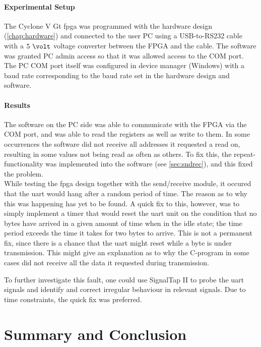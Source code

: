 \documentclass[main.tex]{subfiles}
\begin{document}
\subsubsection{Experimental Setup}

The Cyclone V Gt \gls{fpga} was programmed with the hardware design (\ref{chap:hardware}) and connected to the user PC using a USB-to-RS232 cable with a $5~\volt$ voltage converter between the FPGA and the cable. The software was granted PC admin access so that it was allowed access to the COM port. The PC COM port itself was configured in device manager (Windows) with a baud rate corresponding to the baud rate set in the hardware design and software. 

\subsubsection{Results}

The software on the PC side was able to communicate with the FPGA via the COM port, and was able to read the registers as well as write to them. In some occurrences the software did not receive all addresses it requested a read on, resulting in some values not being read as often as others. To fix this, the repeat-functionality was implemented into the software (see \ref{sec:sndrec}), and this fixed the problem.\\

While testing the \gls{fpga} design together with the send/receive module, it occured that the \gls{uart} would hang after a random period of time. The reason as to why this was happening has yet to be found. A quick fix to this, however, was to simply implement a timer that would reset the \gls{uart} unit on the condition that no bytes have arrived in a given amount of time when in the idle state; the time period exceeds the time it takes for two bytes to arrive. This is not a permanent fix, since there is a chance that the \gls{uart} might reset while a byte is under transmission. This might give an explanation as to why the C-program in some cases did not receive all the data it requested during transmission.

To further investigate this fault, one could use SignalTap II to probe the \gls{uart} signals and identify and correct irregular behaviour in relevant signals. Due to time constraints, the quick fix was preferred.

\chapter{Summary and Conclusion}
\end{document}
